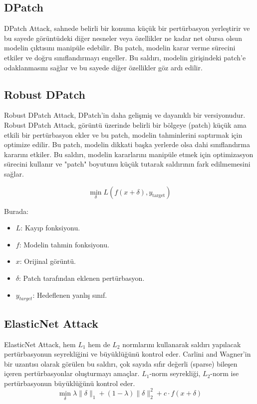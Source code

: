 \newpage

\subsection{DPatch}

DPatch Attack, sahnede belirli bir konuma küçük bir pertürbasyon yerleştirir ve bu sayede görüntüdeki diğer nesneler veya özellikler ne kadar net olursa olsun modelin çıktısını manipüle edebilir. Bu patch, modelin karar verme sürecini etkiler ve doğru sınıflandırmayı engeller. Bu saldırı, modelin girişindeki patch'e odaklanmasını sağlar ve bu sayede diğer özellikler göz ardı edilir.

\newpage

\subsection{Robust DPatch}

Robust DPatch Attack, DPatch'in daha gelişmiş ve dayanıklı bir versiyonudur. Robust DPatch Attack, görüntü üzerinde belirli bir bölgeye (patch) küçük ama etkili bir pertürbasyon ekler ve bu patch, modelin tahminlerini saptırmak için optimize edilir. Bu patch, modelin dikkati başka yerlerde olsa dahi sınıflandırma kararını etkiler. Bu saldırı, modelin kararlarını manipüle etmek için optimizasyon sürecini kullanır ve "patch" boyutunu küçük tutarak saldırının fark edilmemesini sağlar.

\[ \min_\delta L(f(x + \delta), y_{\text{target}}) \]

Burada:

\begin{itemize}
    \item $L$: Kayıp fonksiyonu.
    \item $f$: Modelin tahmin fonksiyonu.
    \item $x$: Orijinal görüntü.
    \item $\delta$: Patch tarafından eklenen pertürbasyon.
    \item $y_{target}$: Hedeflenen yanlış sınıf.
\end{itemize}

\newpage

\subsection{ElasticNet Attack}

ElasticNet Attack, hem $L_1$ hem de $L_2$ normlarını kullanarak saldırı yapılacak pertürbasyonun seyrekliğini ve büyüklüğünü kontrol eder. Carlini and Wagner'in bir uzantısı olarak görülen bu saldırı, çok sayıda sıfır değerli (sparse) bileşen içeren pertürbasyonlar oluşturmayı amaçlar. $L_1$-norm seyrekliği, $L_2$-norm ise pertürbasyonun büyüklüğünü kontrol eder.
\[ \min_\delta \lambda \|\delta\|_1 + (1 - \lambda) \|\delta\|_2^2 + c \cdot f(x + \delta) \]


